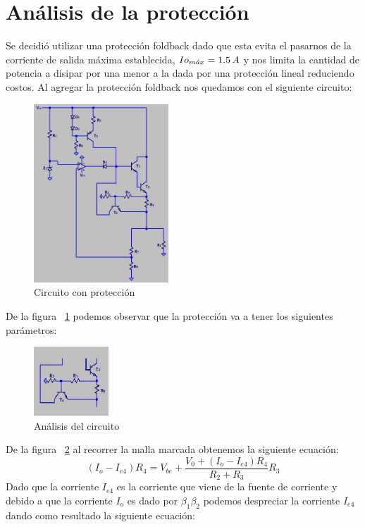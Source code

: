 \documentclass[e2_tp1_main.tex]{subfiles}
\begin{document}
\section{Análisis de la protección}
Se decidió utilizar una protección foldback dado que esta evita el pasarnos de la corriente de salida máxima establecida, $Io_{m\acute{a}x}=1.5\thinspace{A}$ y nos limita la cantidad de potencia a disipar por una menor a la dada por una protección lineal reduciendo costos.
Al agregar la protección foldback nos quedamos con el siguiente circuito:
\begin{figure}[H]
  \centering
   \includegraphics[width=0.45\textwidth]{CircuitoProtec.jpg}
   \caption{Circuito con protección}
   \label{fig:CircuitoProtec}
\end{figure}
De la figura ~\ref{fig:CircuitoProtec} podemos observar que la protección va a tener los siguientes parámetros:
\begin{figure}[H]
  \centering
   \includegraphics[width=0.25\textwidth]{AnalProtec.jpg}
   \caption{Análisis del circuito}
   \label{fig:AnalProtec}
\end{figure}
De la figura ~\ref{fig:AnalProtec} al recorrer la malla marcada obtenemos la siguiente ecuación:
$$(I_o - I_{e4})R_4=V_{be}+\frac{V_0+(I_o - I_{e4})R_4}{R_2+R_3}R_3$$
Dado que la corriente $I_{e4}$ es la corriente que viene de la fuente de corriente y debido a que la corriente $I_o$ es dado por $\beta_1\beta_2$ podemos despreciar la corriente $I_{e4}$ dando como resultado la siguiente ecuación:
\end{document}
